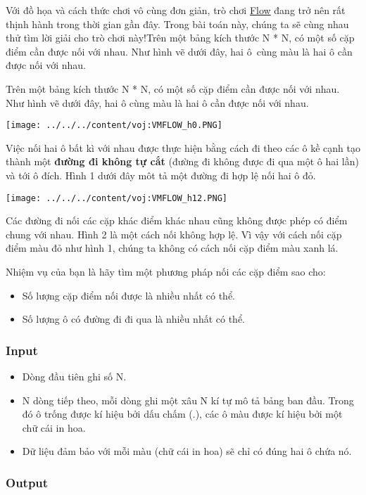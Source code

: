 

Với đồ họa và cách thức chơi vô cùng đơn giản, trò chơi \href{https://chrome.google.com/webstore/detail/flow-free/fkkkloddfalabncnhbhmbekpmkgjcgfl}{Flow} đang trở nên rất thịnh hành trong thời gian gần đây. Trong bài toán này, chúng ta sẽ cùng nhau thử tìm lời giải cho trò chơi này!Trên một bảng kích thước N * N, có một số cặp điểm cần được nối với nhau. Như hình vẽ dưới đây, hai ô cùng màu là hai ô cần được nối với nhau.

Trên một bảng kích thước N * N, có một số cặp điểm cần được nối với nhau. Như hình vẽ dưới đây, hai ô cùng màu là hai ô cần được nối với nhau.


\texttt{[image: ../../../content/voj:VMFLOW\_h0.PNG]}

Việc nối hai ô bất kì với nhau được thực hiện bằng cách đi theo các ô kề cạnh tạo thành một \textbf{đường đi không tự cắt} (đường đi không được đi qua một ô hai lần) và tới ô đích. Hình 1 dưới đây môt tả một đường đi hợp lệ nối hai ô đỏ.


\texttt{[image: ../../../content/voj:VMFLOW\_h12.PNG]}

Các đường đi nối các cặp khác điểm khác nhau cũng không được phép có điểm chung với nhau. Hình 2 là một cách nối không hợp lệ. Vì vậy với cách nối cặp điểm màu đỏ như hình 1, chúng ta không có cách nối cặp điểm màu xanh lá.

Nhiệm vụ của bạn là hãy tìm một phương pháp nối các cặp điểm sao cho:
\begin{itemize}
	\item Số lượng cặp điểm nối được là nhiều nhất có thể.
	\item Số lượng ô có đường đi đi qua là nhiều nhất có thể.
\end{itemize}

\subsubsection{Input}
\begin{itemize}
	\item Dòng đầu tiên ghi số N.
	\item N dòng tiếp theo, mỗi dòng ghi một xâu N kí tự mô tả bảng ban đầu. Trong đó ô trống được kí hiệu bởi dấu chấm (.), các ô màu được kí hiệu bởi một chữ cái in hoa. 
	\item Dữ liệu đảm bảo với mỗi màu (chữ cái in hoa) sẽ chỉ có đúng hai ô chứa nó.
\end{itemize}

\subsubsection{Output}


